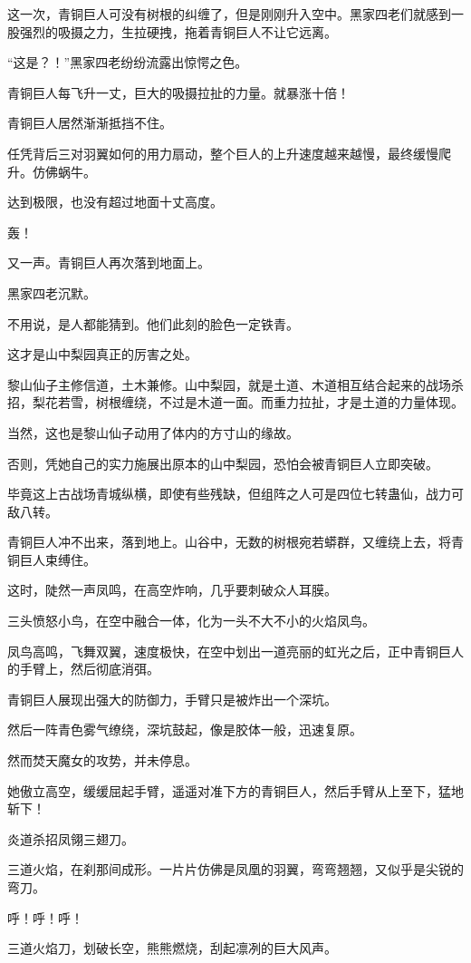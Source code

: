 \begin{this_body}
这一次，青铜巨人可没有树根的纠缠了，但是刚刚升入空中。黑家四老们就感到一股强烈的吸摄之力，生拉硬拽，拖着青铜巨人不让它远离。

“这是？！”黑家四老纷纷流露出惊愕之色。

青铜巨人每飞升一丈，巨大的吸摄拉扯的力量。就暴涨十倍！

青铜巨人居然渐渐抵挡不住。

任凭背后三对羽翼如何的用力扇动，整个巨人的上升速度越来越慢，最终缓慢爬升。仿佛蜗牛。

达到极限，也没有超过地面十丈高度。

轰！

又一声。青铜巨人再次落到地面上。

黑家四老沉默。

不用说，是人都能猜到。他们此刻的脸色一定铁青。

这才是山中梨园真正的厉害之处。

黎山仙子主修信道，土木兼修。山中梨园，就是土道、木道相互结合起来的战场杀招，梨花若雪，树根缠绕，不过是木道一面。而重力拉扯，才是土道的力量体现。

当然，这也是黎山仙子动用了体内的方寸山的缘故。

否则，凭她自己的实力施展出原本的山中梨园，恐怕会被青铜巨人立即突破。

毕竟这上古战场青城纵横，即使有些残缺，但组阵之人可是四位七转蛊仙，战力可敌八转。

青铜巨人冲不出来，落到地上。山谷中，无数的树根宛若蟒群，又缠绕上去，将青铜巨人束缚住。

这时，陡然一声凤鸣，在高空炸响，几乎要刺破众人耳膜。

三头愤怒小鸟，在空中融合一体，化为一头不大不小的火焰凤鸟。

凤鸟高鸣，飞舞双翼，速度极快，在空中划出一道亮丽的虹光之后，正中青铜巨人的手臂上，然后彻底消弭。

青铜巨人展现出强大的防御力，手臂只是被炸出一个深坑。

然后一阵青色雾气缭绕，深坑鼓起，像是胶体一般，迅速复原。

然而焚天魔女的攻势，并未停息。

她傲立高空，缓缓屈起手臂，遥遥对准下方的青铜巨人，然后手臂从上至下，猛地斩下！

炎道杀招凤翎三翅刀。

三道火焰，在刹那间成形。一片片仿佛是凤凰的羽翼，弯弯翘翘，又似乎是尖锐的弯刀。

呼！呼！呼！

三道火焰刀，划破长空，熊熊燃烧，刮起凛冽的巨大风声。


\end{this_body}
